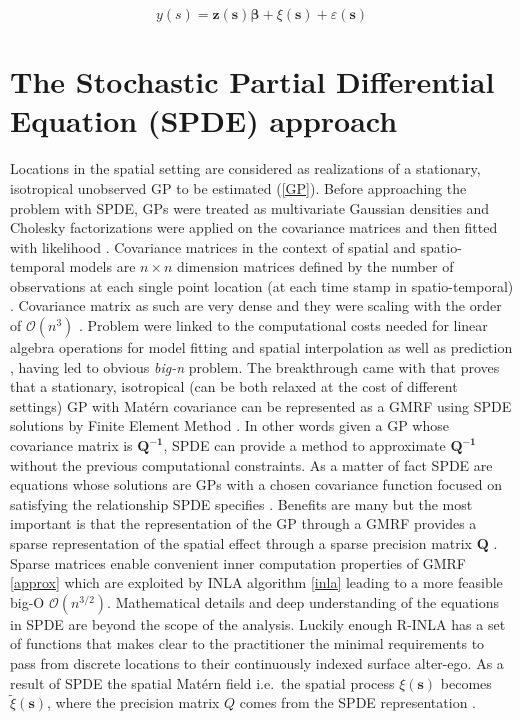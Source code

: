 \documentclass[
  12pt,
  a4paper,
  oneside]{book}
\theoremstyle{definition}
\theoremstyle{definition}
\theoremstyle{definition}
\theoremstyle{remark}
\begin{document}
\[
y(s)=\boldsymbol{z}(\boldsymbol{s}) \boldsymbol{\beta}+\xi(\boldsymbol{s})+\varepsilon(\boldsymbol{s})
\]

\hypertarget{spdeapproach}{%
\section{The Stochastic Partial Differential Equation (SPDE) approach}\label{spdeapproach}}

Locations in the spatial setting are considered as realizations of a stationary, isotropical unobserved GP to be estimated (\ref{GP}). Before approaching the problem with SPDE, GPs were treated as multivariate Gaussian densities and Cholesky factorizations were applied on the covariance matrices and then fitted with likelihood \citep{LecturePaci}. Covariance matrices in the context of spatial and spatio-temporal models \citep{PACI2017149, Cameletti2012} are \(n \times n\) dimension matrices defined by the number of observations at each single point location (at each time stamp in spatio-temporal) \citep{BLANGIARDO201339}. Covariance matrix as such are very dense and they were scaling with the order of \(\mathcal{O}\left(n^{3}\right)\) \citep{Banerjee-Gelfand}. Problem were linked to the computational costs needed for linear algebra operations for model fitting and spatial interpolation as well as prediction \citep{Cameletti2012}, having led to obvious \emph{big-n} problem. The breakthrough came with \citet{Lindgren2011} that proves that a stationary, isotropical (can be both relaxed at the cost of different settings) GP with Matérn covariance can be represented as a GMRF using SPDE solutions by Finite Element Method \citep{Krainski-Rubio}. In other words given a GP whose covariance matrix is \(\boldsymbol{Q^{-1}}\), SPDE can provide a method to approximate \(\boldsymbol{Q^{-1}}\) without the previous computational constraints. As a matter of fact SPDE are equations whose solutions are GPs with a chosen covariance function focused on satisfying the relationship SPDE specifies \citeyearpar{Krainski-Rubio}. Benefits are many but the most important is that the representation of the GP through a GMRF provides a sparse representation of the spatial effect through a sparse precision matrix \(\boldsymbol{Q}\) . Sparse matrices enable convenient inner computation properties of GMRF \ref{approx} which are exploited by INLA algorithm \ref{inla} leading to a more feasible big-O \(\mathcal{O}\left(n^{3 / 2}\right)\). Mathematical details and deep understanding of the equations in SPDE are beyond the scope of the analysis. Luckily enough R-INLA has a set of functions that makes clear to the practitioner the minimal requirements to pass from discrete locations to their continuously indexed surface alter-ego. As a result of SPDE the spatial Matérn field i.e.~the spatial process \(\xi(\boldsymbol{s})\) becomes \(\tilde\xi(\boldsymbol{s})\), where the precision matrix \(Q\) comes from the SPDE representation \citeyearpar{Cameletti2012}.
\end{document}
